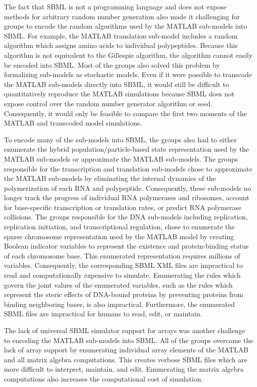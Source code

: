 \documentclass[journal,transmag]{IEEEtran}
\begin{document}
The fact that SBML is not a programming language and does not expose methods for arbitrary random number generation also made it challenging for groups to encode the random algorithms used by the MATLAB sub-models into SBML. For example, the MATLAB translation sub-model includes a random algorithm which assigns amino acids to individual polypeptides. Because this algorithm is not equivalent to the Gillespie algorithm, the algorithm cannot easily be encoded into SBML. Most of the groups also solved this problem by formalizing sub-models as stochastic models. Even if it were possible to transcode the MATLAB sub-models directly into SBML, it would still be difficult to quantitatively reproduce the MATLAB simulations because SBML does not expose control over the random number generator algorithm or seed. Consequently, it would only be feasible to compare the first two moments of the MATLAB and transcoded model simulations.

To encode many of the sub-models into SBML, the groups also had to either enumerate the hybrid population/particle-based state representation used by the MATLAB sub-models or approximate the MATLAB sub-models. The groups responsible for the transcription and translation sub-models chose to approximate the MATLAB sub-models by eliminating the internal dynamics of the polymerization of each RNA and polypeptide. Consequently, these sub-models no longer track the progress of individual RNA polymerases and ribosomes, account for base-specific transcription or translation rates, or predict RNA polymerase collisions. The groups responsible for the DNA sub-models including replication, replication initiation, and transcriptional regulation, chose to enumerate the sparse chromosome representation used by the MATLAB model by creating Boolean indicator variables to represent the existence and protein-binding status of each chromosome base. This enumerated representation requires millions of variables. Consequently, the corresponding SBML XML files are impractical to read and computationally expensive to simulate. Enumerating the rules which govern the joint values of the enumerated variables, such as the rules which represent the steric effects of DNA-bound proteins by preventing proteins from binding neighboring bases, is also impractical. Furthermore, the enumerated SBML files are impractical for humans to read, edit, or maintain.

The lack of universal SBML simulator support for arrays was another challenge to encoding the MATLAB sub-models into SBML. All of the groups overcame the lack of array support by enumerating individual array elements of the MATLAB and all matrix algebra computations. This creates verbose SBML files which are more difficult to interpret, maintain, and edit. Enumerating the matrix algebra computations also increases the computational cost of simulation.
\end{document}
